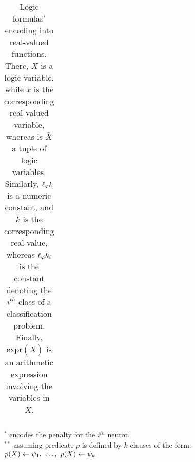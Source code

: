 \begin{table}
\begin{tabular}{l|r||cl|r}
    \end{tabular}
    \begin{center}\scriptsize
        $^{*}$ encodes the penalty for the $i^{th}$ neuron
        \\
        \smallskip
        $^{**}$ assuming predicate $p$ is defined by $k$ clauses of the form:
        \\
        $\pred{p}(\bar{X}) \leftarrow \psi_1,\ \ldots,\ \pred{p}(\bar{X}) \leftarrow \psi_k$
    \end{center}
    \caption[KILL Fuzzifier: Logic Formulae Encoding]{
        Logic formulas' encoding into real-valued functions.
        There, $X$ is a logic variable, while $x$ is the corresponding real-valued variable, whereas is $\bar{X}$ a tuple of logic variables.
        Similarly, $\ell_{\varphi}{k}$ is a numeric constant, and $k$ is the corresponding real value, whereas $\ell_{\varphi}{k}_i$ is the constant denoting the $i^{th}$ class of a classification problem.
        Finally, $\text{expr}(\bar{X})$ is an arithmetic expression involving the variables in $\bar{X}$.
    }
    \label{tab:kill-logic-formulae}
\end{table}
